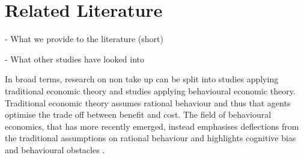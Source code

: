 \section{Related Literature} \label{sec:literature}

- What we provide to the literature (short) 

- What other studies have looked into

In broad terms, research on non take up can be split into studies applying traditional economic theory and studies applying behavioural economic theory. Traditional economic theory assumes rational behaviour and thus that agents optimise the trade off between benefit and cost. The field of behavioural economics, that has more recently emerged, instead emphasises deflections from the traditional assumptions on rational behaviour and highlights cognitive bias and behavioural obstacles \citep{mechelen_who_2017}.